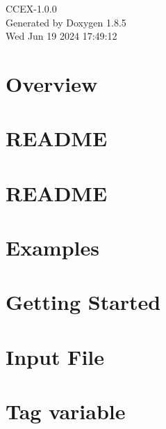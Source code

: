 \documentclass[twoside]{book}
\newcommand{\clearemptydoublepage}{%
  \newpage{\pagestyle{empty}\cleardoublepage}%
}
\begin{document}
\hypersetup{pageanchor=false}
\begin{titlepage}
\vspace*{7cm}
\begin{center}%
{\Large C\-C\-E\-X-\/1.0.0 }\\
\vspace*{1cm}
{\large Generated by Doxygen 1.8.5}\\
\vspace*{0.5cm}
{\small Wed Jun 19 2024 17:49:12}\\
\end{center}
\end{titlepage}
\clearemptydoublepage
\tableofcontents
\clearemptydoublepage
{}
\hypersetup{pageanchor=true}

\chapter{Overview}
\label{index}\hypertarget{index}{}
\chapter{R\-E\-A\-D\-M\-E}
\label{md__home_huijin_git_CCEX_README}
\hypertarget{md__home_huijin_git_CCEX_README}{}

\chapter{R\-E\-A\-D\-M\-E}
\label{README}
\hypertarget{README}{}

\chapter{Examples}
\label{Examples}
\hypertarget{Examples}{}

\chapter{Getting Started}
\label{GettingStarted}
\hypertarget{GettingStarted}{}

\chapter{Input File}
\label{InputFile}
\hypertarget{InputFile}{}

\chapter{Tag variable}
\label{TagVariable}
\hypertarget{TagVariable}{}

\end{document}
